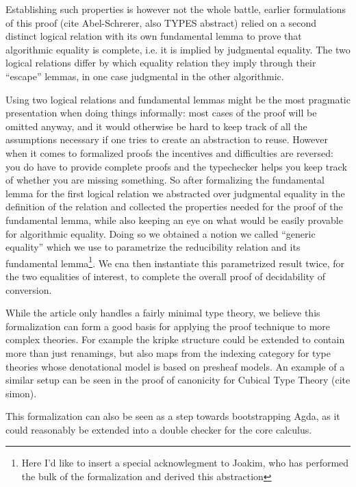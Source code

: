 \documentclass{book}
\begin{document}
Establishing such properties is however not the whole battle, earlier
formulations of this proof (cite Abel-Schrerer, also TYPES abstract)
relied on a second distinct logical relation with its own fundamental
lemma to prove that algorithmic equality is complete, i.e. it is
implied by judgmental equality. The two logical relations differ by
which equality relation they imply through their ``escape'' lemmas, in one
case judgmental in the other algorithmic.

Using two logical relations and fundamental lemmas might be the most
pragmatic presentation when doing things informally: most cases of the
proof will be omitted anyway, and it would otherwise be hard to keep
track of all the assumptions necessary if one tries to create an
abstraction to reuse. However when it comes to formalized proofs the
incentives and difficulties are reversed: you do have to provide
complete proofs and the typechecker helps you keep track of whether
you are missing something. So after formalizing the fundamental lemma
for the first logical relation we abstracted over judgmental equality
in the definition of the relation and collected the properties needed
for the proof of the fundamental lemma, while also keeping an eye on
what would be easily provable for algorithmic equality.  Doing so we
obtained a notion we called ``generic equality'' which we use to
parametrize the reducibility relation and its fundamental
lemma\footnote{Here I'd like to insert a special acknowlegment to
  Joakim, who has performed the bulk of the formalization and derived
  this abstraction}. We cna then instantiate this parametrized result
twice, for the two equalities of interest, to complete the overall
proof of decidability of conversion.


While the article only handles a fairly minimal type theory, we
believe this formalization can form a good basis for applying the
proof technique to more complex theories. For example the kripke
structure could be extended to contain more than just renamings, but
also maps from the indexing category for type theories whose
denotational model is based on presheaf models. An example of a
similar setup can be seen in the proof of canonicity for Cubical Type
Theory (cite simon).

This formalization can also be seen as a step towards bootstrapping
Agda, as it could reasonably be extended into a double checker for the
core calculus.
\end{document}
